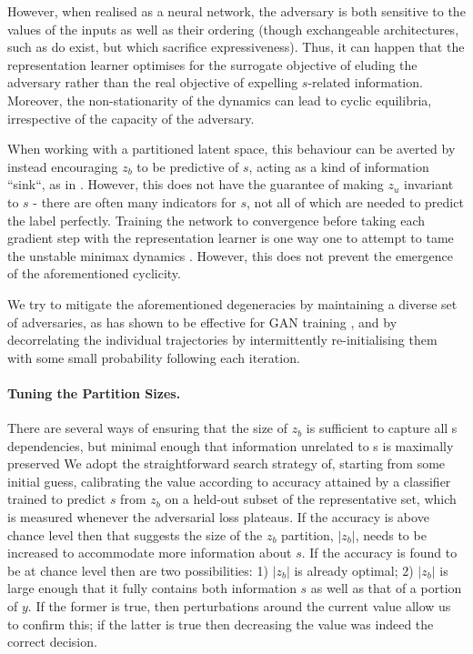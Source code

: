 However, when realised as a neural network, the adversary is both sensitive to the values of the
inputs as well as their ordering (though exchangeable architectures, such as \citet{zaheer2017deep}
do exist, but which sacrifice expressiveness). 
%
Thus, it can happen that the representation learner optimises for the surrogate objective of
eluding the adversary rather than the real objective of expelling $s$-related information. 
%
Moreover, the non-stationarity of the dynamics can lead to cyclic equilibria, irrespective of the
capacity of the adversary.

When working with a partitioned latent space, this behaviour can be averted by instead encouraging
$z_b$ to be predictive of $s$, acting as a kind of information ``sink``, as in \citet{JacSmeOya18}.
%
However, this does not have the guarantee of making $z_u$ invariant to $s$ - there are often many
indicators for $s$, not all of which are needed to predict the label perfectly. 
%
Training the network to convergence before taking each gradient step with the representation
learner is one way one to attempt to tame the unstable minimax dynamics \citep{feng2019learning}. 
%
However, this does not prevent the emergence of the aforementioned cyclicity.

We try to mitigate the aforementioned degeneracies by maintaining a diverse set of adversaries, as
has shown to be effective for GAN training \citep{durugkar2016generative}, and by decorrelating the
individual trajectories by intermittently re-initialising them with some small probability
following each iteration.

\paragraph{Tuning the Partition Sizes.}
%
There are several ways of ensuring that the size of $z_b$ is sufficient to capture all s
dependencies, but minimal enough that information unrelated to s is maximally preserved We adopt
the straightforward search strategy of, starting from some initial guess, calibrating the value
according to accuracy attained by a classifier trained to predict $s$ from $z_b$ on a held-out
subset of the representative set, which is measured whenever the adversarial loss plateaus. 
%
If the accuracy is above chance level then that suggests the size of the $z_b$ partition, $|z_b|$,
needs to be increased to accommodate more information about $s$. 
%
If the accuracy is found to be at chance level then are two possibilities: 
%
1) $|z_b|$ is already optimal; 
%
2) $|z_b|$ is large enough that it fully contains both information $s$ as well as that of a portion
of $y$. 
%
If the former is true, then perturbations around the current value allow us to confirm this; if the
latter is true then decreasing the value was indeed the correct decision.

